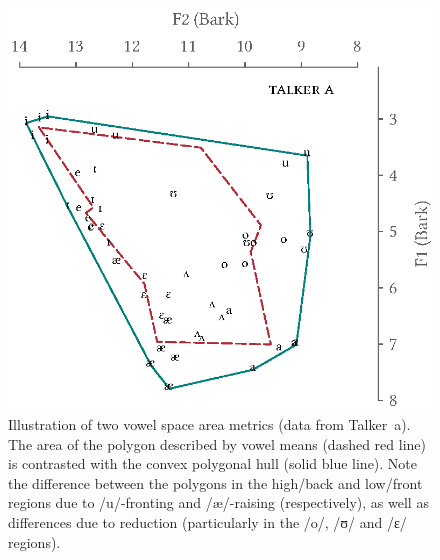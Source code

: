 \begin{figure}[bt]
	\begin{centering}
	\includegraphics{figures/posthocs/ConvexHull.eps}
	\caption[Vowel space metrics]{Illustration of two vowel space area metrics (data from Talker~\ac{a}).  The area of the polygon described by vowel means (dashed red line) is contrasted with the convex polygonal hull (solid blue line).  Note the difference between the polygons in the high\-/back and low\-/front regions due to /u/-fronting and /æ/-raising (respectively), as well as differences due to reduction (particularly in the /o/, /ʊ/ and /ɛ/ regions).\label{fig:ConvexHull}}
	\end{centering}
\end{figure}

